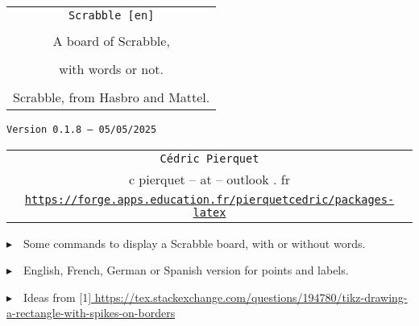\documentclass{article}
\def\TPversion{0.1.8}
\def\TPdate{05/05/2025}
\begin{document}
\pagestyle{fancy}

\thispagestyle{empty}

\vspace{2cm}

\begin{center}
	\begin{minipage}{0.75\linewidth}
	\begin{tcolorbox}[colframe=yellow,colback=yellow!15]
		\begin{center}
			\begin{tabular}{c}
				{\Huge \texttt{Scrabble [en]}}\\
				\\
				{\LARGE A board of Scrabble,} \\
				\\
				{\LARGE with words or not.} \\
				\\
				{Scrabble\texttrademark{}, from Hasbro\texttrademark{} and Mattel\texttrademark{}.}
			\end{tabular}
			
			\medskip
			
			{\small \texttt{Version \TPversion{} -- \TPdate}}
		\end{center}
	\end{tcolorbox}
\end{minipage}
\end{center}

\vspace{0.5cm}

\begin{center}
	\begin{tabular}{c}
	\texttt{Cédric Pierquet}\\
	{\ttfamily c pierquet -- at -- outlook . fr}\\
	\texttt{\url{https://forge.apps.education.fr/pierquetcedric/packages-latex}}
\end{tabular}
\end{center}

\vspace{0.5cm}

{$\blacktriangleright$~~Some commands to display a Scrabble board, with or without words.}

\smallskip

{$\blacktriangleright$~~English, French, German or Spanish version for points and labels.}

\smallskip

{$\blacktriangleright$~~Ideas from \scalebox{0.8}[1]{\ttfamily\url{ https://tex.stackexchange.com/questions/194780/tikz-drawing-a-rectangle-with-spikes-on-borders}}}
\end{document}
